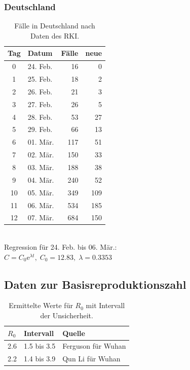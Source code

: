 \documentclass[a4paper,11pt,fleqn,twocolumn,twoside,dvipdfmx]{scrartcl}
\numberwithin{equation}{section}
\newcommand{\ee}{\mathrm e}
\newcommand{\strong}[1]{\textbf{#1}}
\begin{document}
\subsubsection*{Deutschland}
\begin{table}[h]
\caption{Fälle in Deutschland\newline
nach Daten des RKI.}
\begin{tabular}{clrr}
\toprule
\strong{Tag} & \strong{Datum} & \strong{Fälle} & \strong{neue}\\
\midrule
0 & 24. Feb. & 16 & 0\\
1 & 25. Feb. & 18 & 2\\
2 & 26. Feb. & 21 & 3\\
3 & 27. Feb. & 26 & 5\\
4 & 28. Feb. & 53 & 27\\
5 & 29. Feb. & 66 & 13\\
6 & 01. Mär. & 117 & 51\\
7 & 02. Mär. & 150 & 33\\
8 & 03. Mär. & 188 & 38\\
9 & 04. Mär. & 240 & 52\\
10 & 05. Mär. & 349 & 109\\
11 & 06. Mär. & 534 & 185\\
12 & 07. Mär. & 684 & 150\\
\bottomrule
\end{tabular}\\[6pt]
Regression für 24. Feb. bis 06. Mär.:\\
$C = C_0\ee^{\lambda t},\; C_0=12.83,\; \lambda=0.3353$
\end{table}

\newpage
\subsection{Daten zur Basisreproduktionszahl}
\begin{table}[h]
\caption{Ermittelte Werte für $R_0$ mit\newline
Intervall der Unsicherheit.}
\begin{tabular}{lll}
\toprule
$R_0$ & Intervall & Quelle\\
\midrule
2.6 & 1.5 bis 3.5 & Ferguson für Wuhan \cite{Ferguson}\\
2.2 & 1.4 bis 3.9 & Qun Li für Wuhan \cite{QunLi}\\
\bottomrule
\end{tabular}
\end{table}
\end{document}
